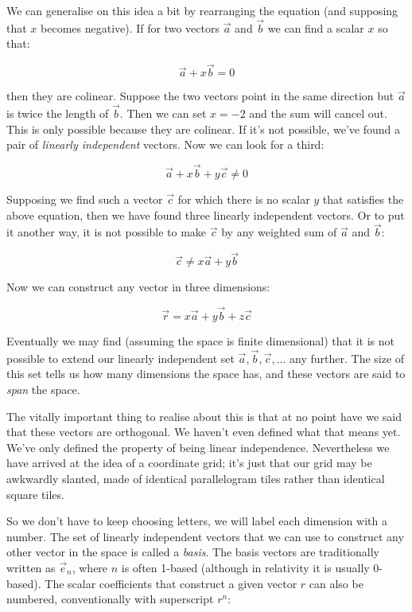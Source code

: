 We can generalise on this idea a bit by rearranging the equation (and supposing that $x$ becomes negative). If for two vectors $\vec{a}$ and $\vec{b}$ we can find a scalar ${x}$ so that:

$$ 
\vec{a} + x \vec{b} = 0
$$

then they are colinear. Suppose the two vectors point in the same direction but $\vec{a}$ is twice the length of $\vec{b}$. Then we can set $x = -2$ and the sum will cancel out. This is only possible because they are colinear. If it's not possible, we've found a pair of \textit{linearly independent} vectors. Now we can look for a third:

$$ 
\vec{a} + x \vec{b} + y \vec{c} \ne 0
$$

Supposing we find such a vector $\vec{c}$ for which there is no scalar $y$ that satisfies the above equation, then we have found three linearly independent vectors. Or to put it another way, it is not possible to make $\vec{c}$ by any weighted sum of $\vec{a}$ and $\vec{b}$:

$$
\vec{c} \ne x \vec{a} + y \vec{b}
$$

Now we can construct any vector in three dimensions:

$$
\vec{r} = x \vec{a} + y \vec{b} + z \vec{c}
$$

Eventually we may find (assuming the space is finite dimensional) that it is not possible to extend our linearly independent set $\vec{a}, \vec{b}, \vec{c}, ...$ any further. The size of this set tells us how many dimensions the space has, and these vectors are said to \textit{span} the space.

The vitally important thing to realise about this is that at no point have we said that these vectors are orthogonal. We haven't even defined what that means yet. We've only defined the property of being linear independence. Nevertheless we have arrived at the idea of a coordinate grid; it's just that our grid may be awkwardly slanted, made of identical parallelogram tiles rather than identical square tiles.

So we don't have to keep choosing letters, we will label each dimension with a number. The set of linearly independent vectors that we can use to construct any other vector in the space is called a \textit{basis}. The basis vectors are traditionally written as $\vec{e}_n$, where $n$ is often 1-based (although in relativity it is usually 0-based). The scalar coefficients that construct a given vector $r$ can also be numbered, conventionally with superscript $r^n$:

